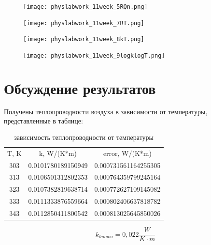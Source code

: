 \documentclass[a4paper,12pt]{article} %
\begin{document}
\begin{figure}[h!]
\begin{floatrow}
         {\texttt{[image: physlabwork\_11week\_5RQn.png]}}     
\end{floatrow}
\end{figure}
\restoregeometry

\hypertarget{p91}{}
\begin{figure}[h!]
\begin{floatrow}
         {\texttt{[image: physlabwork\_11week\_7RT.png]}}     
\end{floatrow}
\end{figure}

\hypertarget{p92}{}
\begin{figure}[h!]
\begin{floatrow}
         {\texttt{[image: physlabwork\_11week\_8kT.png]}}     
\end{floatrow}
\end{figure}

\hypertarget{p93}{}
\begin{figure}[h!]
\begin{floatrow}
         {\texttt{[image: physlabwork\_11week\_9logklogT.png]}}     
\end{floatrow}
\end{figure}

\section{Обсуждение результатов}
Получены теплопроводности воздуха в зависимости от температуры, представленные в таблице:
\begin{table}[H]
\caption{зависимость теплопроводности от температуры}
\label{tabular:timesandtenses}
\begin{center}
\begin{tabular}{ccc}
T, K & k, W/(K*m) & error, W/(K*m)\\
303 & 0.0101780189150949 & 0.000731561164255305\\
313 & 0.0106501312802353 & 0.000764359799245164\\
323 & 0.0107382819638714 & 0.000772627109145082\\
333 & 0.0111333876559664 & 0.000802406637818782\\
343 & 0.0112850411800542 & 0.000813025645850026\\
\end{tabular}
\end{center}
\end{table}
\begin{equation*}
    k_{known} = 0,022 \frac{W}{K \cdot m}
\end{equation*}
\end{document}
